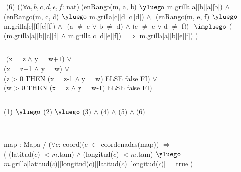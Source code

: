 \begin{Representacion}
$ $\newline
(6)
(($\forall a, b, c, d, e, f$: nat)$ $\newline
(enRango(m, a, b) $\yluego$ m.grilla[a][b][a][b]) $\land$ $ $\newline
(enRango(m, c, d) $\yluego$ m.grilla[c][d][c][d]) $\land$ $ $\newline
(enRango(m, e, f) $\yluego$ m.grilla[e][f][e][f]) $\land$ $ $\newline
(a $\neq$ c $\lor$ b $\neq$ d) $\land$ (c $\neq$ e $\lor$ d $\neq$ f)) $ $\newline
$\impluego$ ( (m.grilla[a][b][c][d] $\land$ m.grilla[c][d][e][f]) $\implies$ m.grilla[a][b][e][f]) ) $ $\newline

$ $\newline
{}%

$ $\newline
{}%
{
(x = z $\land$ y = w+1) $\lor$ \\
(x = z+1 $\land$ y = w) $\lor$ \\
(\IF z > 0 THEN (x = z-1 $\land$ y = w) ELSE false FI) $\lor$ \\
(\IF w > 0 THEN (x = z $\land$ y = w-1) ELSE false FI)
} 


$ $\newline

%
{{(1) $\yluego$ (2) $\yluego$ (3) $\land$ (4) $\land$ (5) $\land$ (6)}} 

$ $\newline
$ $\newline



%
{map : Mapa / ($\forall c$: coord)(c $\in$ coordenadas(map)) $\iff$ \\
( (latitud($c$) $< m$.tam) $\land$ (longitud($c$) $< m$.tam) $\yluego$ \\
\hspace{1cm}	$m$.grilla[latitud($c$)][longitud($c$)][latitud($c$)][longitud($c$)] = true )}%

\end{Representacion}


